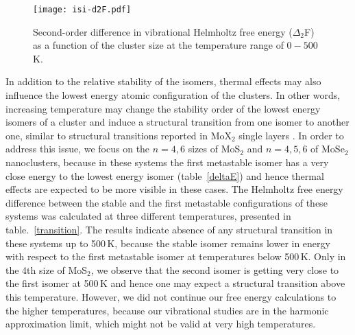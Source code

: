\documentclass[nofootinbib,10pt,aip,twocolumn,showpacs]{revtex4-1}
\begin{document}
\begin{figure}
\centering
\texttt{[image: isi-d2F.pdf]}
\caption{\label{d2F}
Second-order difference in vibrational Helmholtz free energy ($\Delta_2$F) 
as a function of the cluster size at the temperature range of $0-500$\,K.}
\end{figure}

In addition to the relative stability of the isomers, 
thermal effects may also influence the lowest energy 
atomic configuration of the clusters.
In other words, increasing temperature may change the stability order of
the lowest energy isomers of a cluster and induce a structural transition
from one isomer to another one, similar to structural transitions reported
in MoX$_2$ single layers \cite{ambrosi2015,duerloo2014}.
In order to address this issue, we focus on the $n=4,6$ sizes of MoS$_2$ and 
$n=4,5,6$ of MoSe$_2$ nanoclusters, because in these systems the first metastable
isomer has a very close energy to the lowest energy isomer (table~\ref{deltaE}) 
and hence thermal effects are expected to be more visible in these cases.
The Helmholtz free energy difference between the stable and the first metastable 
configurations of these systems was calculated at three different temperatures,
presented in table.~\ref{transition}.
The results indicate absence of any structural transition in these
systems up to 500\,K, because the stable isomer remains lower in energy
with respect to the first metastable isomer at temperatures below 500\,K.
Only in the 4th size of MoS$_2$, we observe that the second isomer is 
getting very close to the first isomer at 500\,K and hence one may expect
a structural transition above this temperature.
However, we did not continue our free energy calculations to the higher
temperatures, because our vibrational studies are in the harmonic
approximation limit, which might not be valid at very high temperatures.
\end{document}
